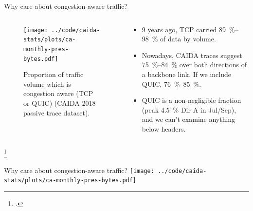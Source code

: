 \documentclass[aspectratio=169,xcolor={dvipsnames}
,hide notes
]{beamer}
\begin{document}
\begin{frame}{Why care about congestion-aware traffic?}
\begin{columns}
	\begin{column}{0.5\linewidth}
		\begin{figure}
			\texttt{[image: ../code/caida-stats/plots/ca-monthly-pres-bytes.pdf]}
			\caption{Proportion of traffic volume which is congestion aware (TCP or QUIC) (CAIDA 2018 passive trace dataset).}
		\end{figure}
	\end{column}
	\begin{column}{0.45\linewidth}
		\begin{itemize}
			\item 9 years ago, TCP carried \SIrange{89}{98}{\percent} of data by volume\footnotemark.
			\item Nowadays, CAIDA traces suggest \SIrange{75}{84}{\percent} over both directions of a backbone link. If we include QUIC, \SIrange{76}{85}{\percent}.
			\item QUIC is a non-negligible fraction (peak \SI{4.5}{\percent} Dir A in Jul/Sep), and we can't examine anything below headers.
		\end{itemize}
	\end{column}
\end{columns}
\footcitetext{DBLP:conf/saint/ZhangDJC09}
\end{frame}

\begin{frame}{Why care about congestion-aware traffic?}
\centering
\texttt{[image: ../code/caida-stats/plots/ca-monthly-pres-bytes.pdf]}
\end{frame}
\end{document}
